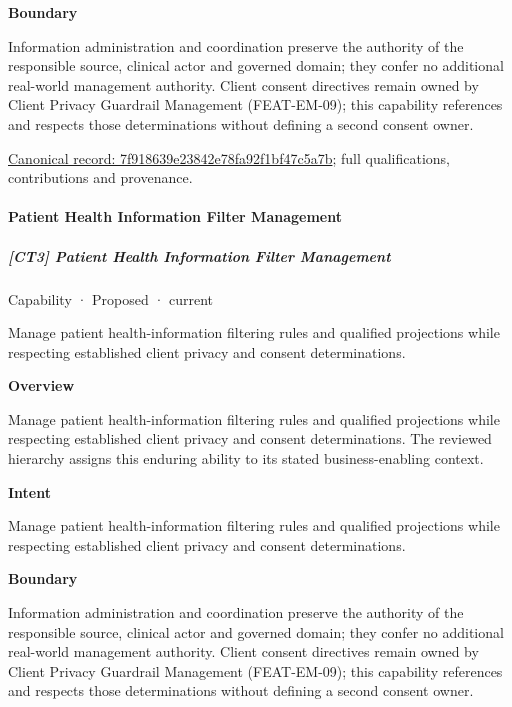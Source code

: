 \textbf{Boundary}



Information administration and coordination preserve the authority of the responsible source, clinical actor and governed domain; they confer no additional real-world management authority. Client consent directives remain owned by Client Privacy Guardrail Management (FEAT-EM-09); this capability references and respects those determinations without defining a second consent owner.


{\footnotesize \href{../../../../continuum/strategy/capability/7f918639e23842e78fa92f1bf47c5a7b.md}{Canonical record: 7f918639e23842e78fa92f1bf47c5a7b}; full qualifications, contributions and provenance.}\par
\paragraph{Patient Health Information Filter Management}

\subparagraph{[CT3] Patient Health Information Filter Management}

\label{element:62f673613c76494eba972cad3e4e8d0b}
{\small Capability · Proposed · current}\par

Manage patient health-information filtering rules and qualified projections while respecting established client privacy and consent determinations.



\textbf{Overview}



Manage patient health-information filtering rules and qualified projections while respecting established client privacy and consent determinations. The reviewed hierarchy assigns this enduring ability to its stated business-enabling context.



\textbf{Intent}



Manage patient health-information filtering rules and qualified projections while respecting established client privacy and consent determinations.



\textbf{Boundary}



Information administration and coordination preserve the authority of the responsible source, clinical actor and governed domain; they confer no additional real-world management authority. Client consent directives remain owned by Client Privacy Guardrail Management (FEAT-EM-09); this capability references and respects those determinations without defining a second consent owner.


